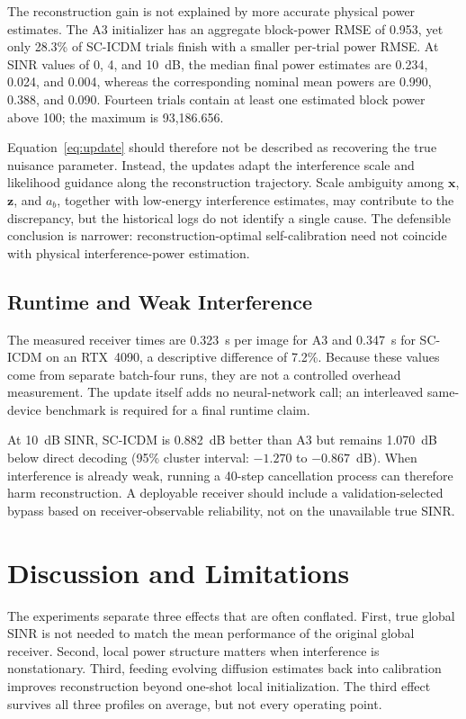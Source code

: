 \documentclass[conference]{IEEEtran}
\newcommand{\method}{SC-ICDM}
\newcommand{\vect}[1]{\boldsymbol{#1}}
\begin{document}
The reconstruction gain is not explained by more accurate physical power
estimates. The A3 initializer has an aggregate block-power RMSE of 0.953, yet
only 28.3\% of \method{} trials finish with a smaller per-trial power RMSE.
At SINR values of 0, 4, and 10~dB, the median final power estimates are
0.234, 0.024, and 0.004, whereas the corresponding nominal mean powers are
0.990, 0.388, and 0.090. Fourteen trials contain at least one estimated block
power above 100; the maximum is 93,186.656.

Equation~\eqref{eq:update} should therefore not be described as recovering
the true nuisance parameter. Instead, the updates adapt the interference
scale and likelihood guidance along the reconstruction trajectory. Scale
ambiguity among $\vect{x}$, $\vect{z}$, and $a_b$, together with low-energy
interference estimates, may contribute to the discrepancy, but the historical
logs do not identify a single cause. The defensible conclusion is narrower:
reconstruction-optimal self-calibration need not coincide with physical
interference-power estimation.

\subsection{Runtime and Weak Interference}

The measured receiver times are 0.323~s per image for A3 and 0.347~s for
\method{} on an RTX~4090, a descriptive difference of 7.2\%. Because these
values come from separate batch-four runs, they are not a controlled overhead
measurement. The update itself adds no neural-network call; an interleaved
same-device benchmark is required for a final runtime claim.

At 10~dB SINR, \method{} is 0.882~dB better than A3 but remains 1.070~dB
below direct decoding (95\% cluster interval: $-1.270$ to $-0.867$~dB).
When interference is already weak, running a 40-step cancellation process can
therefore harm reconstruction. A deployable receiver should include a
validation-selected bypass based on receiver-observable reliability, not on
the unavailable true SINR.

\balance
\section{Discussion and Limitations}

The experiments separate three effects that are often conflated. First, true
global SINR is not needed to match the mean performance of the original global
receiver. Second, local power structure matters when interference is
nonstationary. Third, feeding evolving diffusion estimates back into
calibration improves reconstruction beyond one-shot local initialization.
The third effect survives all three profiles on average, but not every
operating point.
\end{document}

